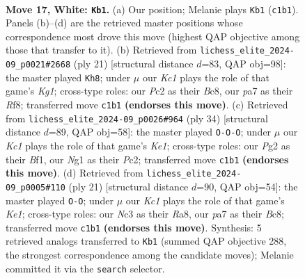 \documentclass[11pt]{article}
\begin{document}
\clearpage

\begin{figure}[p]\centering
\begin{subfigure}{0.46\textwidth}\centering
\resizebox{\linewidth}{!}{%
\newchessgame
\chessboard[
  setfen={rnb1r3/p2nq1kp/1p2p1p1/2ppP3/8/2N5/PPPQ1PPP/2K1RBNR w - - 0 17},
  showmover=false,
  pgfstyle=straightmove, color=movearrow, markmove={c1-b1}
]}
\caption{}
\end{subfigure}\hfill
\begin{subfigure}{0.46\textwidth}\centering
\resizebox{\linewidth}{!}{%
\newchessgame
\chessboard[
  setfen={r1b2rk1/pp1ppp1p/1qn4b/8/3PP2p/1PPQ1N2/P5PP/RN2KB1R b KQ - 2 11},
  showmover=false,
  pgfstyle=straightmove, color=movearrow, markmove={g8-h8}
]}
\caption{}
\end{subfigure}
\\[4pt]
\begin{subfigure}{0.46\textwidth}\centering
\resizebox{\linewidth}{!}{%
\newchessgame
\chessboard[
  setfen={r1bqk2r/ppp2p2/3pn2p/8/4PPnP/2N3pN/PPPQ2P1/R3KB1R w KQkq - 0 18},
  showmover=false,
  pgfstyle=straightmove, color=movearrow, markmove={e1-c1}
]}
\caption{}
\end{subfigure}\hfill
\begin{subfigure}{0.46\textwidth}\centering
\resizebox{\linewidth}{!}{%
\newchessgame
\chessboard[
  setfen={r1b1k2r/pp1nqpp1/2p4p/3p3n/3P4/2NBP3/PP1QNPPP/R3K2R b KQkq - 1 11},
  showmover=false,
  pgfstyle=straightmove, color=movearrow, markmove={e8-g8}
]}
\caption{}
\end{subfigure}
\caption{\textbf{Move 17, White: \texttt{Kb1}.} (a) Our position; Melanie plays \texttt{Kb1} (\texttt{c1b1}). Panels (b)--(d) are the retrieved master positions whose correspondence most drove this move (highest QAP objective among those that transfer to it). (b) Retrieved from \texttt{lichess\_elite\_2024-09\_p0021\#2668} (ply 21) [structural distance $d$=83, QAP obj=98]: the master played \texttt{Kh8}; under $\mu$ our \emph{Kc1} plays the role of that game's \emph{Kg1}; cross-type roles: our \emph{P}c2 as their \emph{B}c8, our \emph{p}a7 as their \emph{R}f8; transferred move \texttt{c1b1} \textbf{(endorses this move)}. (c) Retrieved from \texttt{lichess\_elite\_2024-09\_p0026\#964} (ply 34) [structural distance $d$=89, QAP obj=58]: the master played \texttt{O-O-O}; under $\mu$ our \emph{Kc1} plays the role of that game's \emph{Ke1}; cross-type roles: our \emph{P}g2 as their \emph{B}f1, our \emph{N}g1 as their \emph{P}c2; transferred move \texttt{c1b1} \textbf{(endorses this move)}. (d) Retrieved from \texttt{lichess\_elite\_2024-09\_p0005\#110} (ply 21) [structural distance $d$=90, QAP obj=54]: the master played \texttt{O-O}; under $\mu$ our \emph{Kc1} plays the role of that game's \emph{Ke1}; cross-type roles: our \emph{N}c3 as their \emph{R}a8, our \emph{p}a7 as their \emph{B}c8; transferred move \texttt{c1b1} \textbf{(endorses this move)}. Synthesis: 5 retrieved analogs transferred to \texttt{Kb1} (summed QAP objective 288, the strongest correspondence among the candidate moves); Melanie committed it via the \texttt{search} selector.}
\label{fig:thought-m32}
\end{figure}
\end{document}
